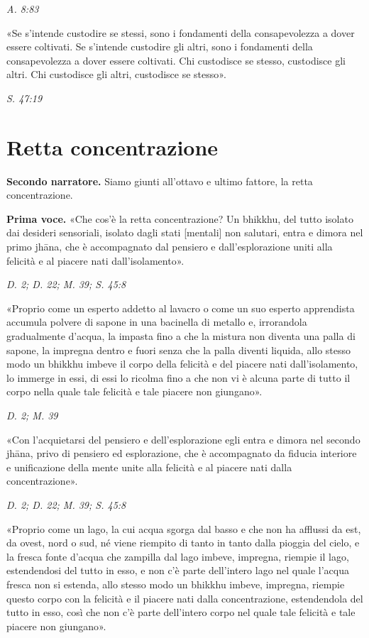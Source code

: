 \emph{A. 8:83}


«Se s’intende custodire se stessi, sono i fondamenti della
consapevolezza a dover essere coltivati. Se s’intende custodire gli
altri, sono i fondamenti della consapevolezza a dover essere coltivati.
Chi custodisce se stesso, custodisce gli altri. Chi custodisce gli
altri, custodisce se stesso».


\emph{S. 47:19}


\hypertarget{x-retta-concentrazione}{\section*{Retta concentrazione}}
\textbf{Secondo narratore.} Siamo giunti all’ottavo e ultimo fattore, la retta
concentrazione.


\textbf{Prima voce.} «Che cos’è la retta concentrazione? Un bhikkhu, del tutto
isolato dai desideri sensoriali, isolato dagli stati [mentali] non
salutari, entra e dimora nel primo jhāna, che è accompagnato dal
pensiero e dall’esplorazione uniti alla felicità e al piacere nati
dall’isolamento».


\emph{D. 2; D. 22; M. 39; S. 45:8}


«Proprio come un esperto addetto al lavacro o come un suo esperto
apprendista accumula polvere di sapone in una bacinella di metallo e,
irrorandola gradualmente d’acqua, la impasta fino a che la mistura non
diventa una palla di sapone, la impregna dentro e fuori senza che la
palla diventi liquida, allo stesso modo un bhikkhu imbeve il corpo della
felicità e del piacere nati dall’isolamento, lo immerge in essi, di essi
lo ricolma fino a che non vi è alcuna parte di tutto il corpo nella
quale tale felicità e tale piacere non giungano».


\emph{D. 2; M. 39}


«Con l’acquietarsi del pensiero e dell’esplorazione egli entra e dimora
nel secondo jhāna, privo di pensiero ed esplorazione, che è accompagnato
da fiducia interiore e unificazione della mente unite alla felicità e al
piacere nati dalla concentrazione».


\emph{D. 2; D. 22; M. 39; S. 45:8}


«Proprio come un lago, la cui acqua sgorga dal basso e che non ha
afflussi da est, da ovest, nord o sud, né viene riempito di tanto in
tanto dalla pioggia del cielo, e la fresca fonte d’acqua che zampilla
dal lago imbeve, impregna, riempie il lago, estendendosi del tutto in
esso, e non c’è parte dell’intero lago nel quale l’acqua fresca non si
estenda, allo stesso modo un bhikkhu imbeve, impregna, riempie questo
corpo con la felicità e il piacere nati dalla concentrazione,
estendendola del tutto in esso, così che non c’è parte dell’intero corpo
nel quale tale felicità e tale piacere non giungano».


